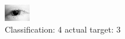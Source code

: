 \begin{figure}[h!]
\begin{center}
\includegraphics[width=0.60\columnwidth]{figures/ID40_class_4_target_3.png}
\end{center}
\caption{ Classification: 4 actual target: 3}
\label{fig:ID40_class_4_target_3}
\end{figure}
